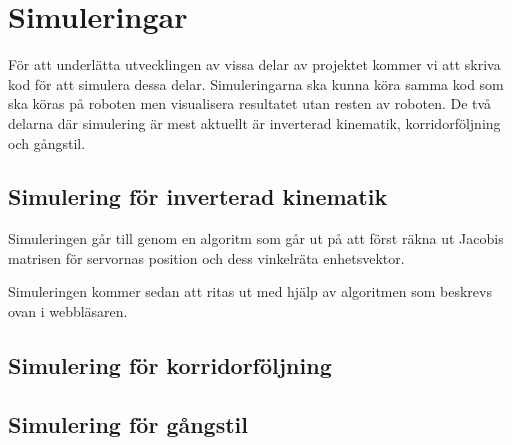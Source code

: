 \documentclass[a4paper,titlepage,12pt]{article}
\begin{document}
	\section{Simuleringar}
	För att underlätta utvecklingen av vissa delar av projektet kommer vi att skriva
	kod för att simulera dessa delar. Simuleringarna ska kunna köra samma kod som ska
	köras på roboten men visualisera resultatet utan resten av roboten. De två
	delarna där simulering är mest aktuellt är inverterad kinematik, korridorföljning 
	och gångstil.

	\subsection{Simulering för inverterad kinematik}
	Simuleringen går till genom en algoritm som går ut på att först räkna ut Jacobis matrisen för servornas position och dess vinkelräta enhetsvektor.
	
	Simuleringen kommer sedan att ritas ut med hjälp av algoritmen som beskrevs ovan i webbläsaren.
	
	\subsection{Simulering för korridorföljning}
	
	\subsection{Simulering för gångstil}
\end{document}
